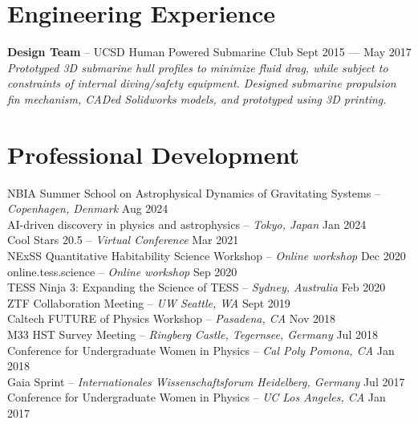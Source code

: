 \documentclass[a4,11pt]{article}
\begin{document}
\section{Engineering Experience}
\textbf{Design Team} -- UCSD Human Powered Submarine Club \hfill Sept 2015 --- May 2017  \\
\textsl{Prototyped 3D submarine hull profiles to minimize fluid drag, while subject to constraints of internal diving/safety equipment. Designed submarine propulsion fin mechanism, CADed Solidworks models, and prototyped using 3D printing. }

\section{Professional Development}

NBIA Summer School on Astrophysical Dynamics of Gravitating Systems -- \textit{Copenhagen, Denmark} \hfill Aug 2024 \\
AI-driven discovery in physics and astrophysics -- \textit{Tokyo, Japan} \hfill Jan 2024 \\
Cool Stars 20.5 -- \textit{Virtual Conference} \hfill Mar 2021 \\
NExSS Quantitative Habitability Science Workshop -- \textit{Online workshop} \hfill Dec 2020 \\
online.tess.science -- \textit{Online workshop} \hfill Sep 2020 \\
TESS Ninja 3: Expanding the Science of TESS -- \textit{Sydney, Australia} \hfill Feb 2020 \\
ZTF Collaboration Meeting -- \textit{UW Seattle, WA} \hfill Sept 2019 \\
Caltech FUTURE of Physics Workshop -- \textit{Pasadena, CA} \hfill Nov 2018 \\
M33 HST Survey Meeting -- \textit{Ringberg Castle, Tegernsee, Germany} \hfill Jul 2018 \\
Conference for Undergraduate Women in Physics -- \textit{Cal Poly Pomona, CA}  \hfill Jan 2018 \\
Gaia Sprint -- \textit{Internationales Wissenschaftsforum Heidelberg, Germany}  \hfill Jul 2017 \\
Conference for Undergraduate Women in Physics -- \textit{UC Los Angeles, CA}  \hfill Jan 2017 

\end{document}
